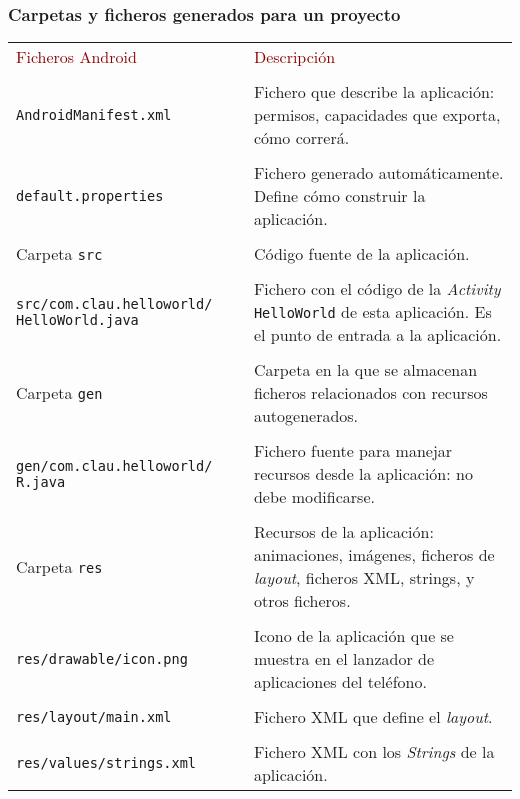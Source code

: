 \documentclass[hyperref={pdfpagelabels=true},utf8x]{beamer}
\newcommand{\res}[1]{\textcolor{darkred}{#1}}
\newcommand{\dif}{\textsl}
\begin{document}
\begin{frame}[fragile]
\frametitle{Carpetas y ficheros generados para un proyecto}

\begin{tiny}
\begin{tabular}{|p{3cm}|p{7cm}|}
\hline
\res{Ficheros Android}           &	\res{Descripción} \\
&\\\hline\hline
\verb|AndroidManifest.xml| & Fichero que describe la aplicación: permisos, capacidades que exporta, cómo correrá.\\\hline
&\\
\verb|default.properties| & Fichero generado automáticamente. Define cómo construir la aplicación.  \\\hline
&\\
Carpeta \verb|src|  & Código fuente de la aplicación.\\\hline
&\\
\verb|src/com.clau.helloworld/|
\verb|HelloWorld.java| & Fichero  con el código de la \dif{Activity} \verb|HelloWorld| de esta aplicación. Es el punto de entrada a la aplicación.\\\hline
&\\                         

Carpeta \verb|gen|  &  Carpeta en la que se almacenan  ficheros relacionados con recursos autogenerados.\\\hline
&\\
\verb|gen/com.clau.helloworld/|
\verb|R.java|  & Fichero fuente para manejar recursos desde la aplicación: no debe modificarse.\\\hline
&\\
Carpeta \verb|res| 	&  Recursos de la aplicación: animaciones, imágenes, ficheros de \emph{layout}, ficheros XML, strings, y otros ficheros.\\\hline
&\\
\verb|res/drawable/icon.png|	& Icono de la aplicación que se muestra en el lanzador de aplicaciones del teléfono.\\\hline
&\\
\verb|res/layout/main.xml|	& Fichero XML que define el \emph{layout}.\\\hline
&\\
\verb|res/values/strings.xml|	& Fichero XML con los \emph{Strings} de la aplicación.\\\hline
\end{tabular}
\end{tiny}

\end{frame}
\end{document}
